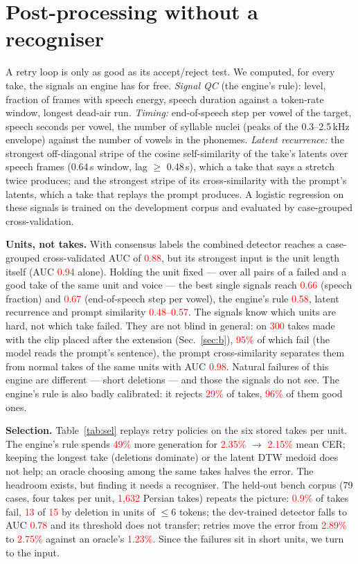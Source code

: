 \documentclass[conference]{IEEEtran}
\newcommand{\RES}[1]{\textcolor{red}{#1}}
\begin{document}
\section{Post-processing without a recogniser}\label{sec:a}
A retry loop is only as good as its accept/reject test. We computed, for every take, the signals an engine
has for free.
\emph{Signal QC} (the engine's rule): level, fraction of frames with speech energy, speech duration against
a token-rate window, longest dead-air run.
\emph{Timing:} end-of-speech step per vowel of the target, speech seconds per vowel, the number of syllable
nuclei (peaks of the 0.3--2.5\,kHz envelope) against the number of vowels in the phonemes.
\emph{Latent recurrence:} the strongest off-diagonal stripe of the cosine self-similarity of the take's
latents over speech frames (0.64\,s window, lag $\ge$ 0.48\,s), which a take that says a stretch twice
produces; and the strongest stripe of its cross-similarity with the prompt's latents, which a take that
replays the prompt produces.
A logistic regression on these signals is trained on the development corpus and evaluated by
case-grouped cross-validation.

\textbf{Units, not takes.} With consensus labels the combined detector reaches a case-grouped
cross-validated AUC of \RES{0.88}, but its strongest input is the unit length itself (AUC \RES{0.94} alone).
Holding the unit fixed --- over all pairs of a failed and a good take of the same unit and voice --- the best
single signals reach \RES{0.66} (speech fraction) and \RES{0.67} (end-of-speech step per vowel), the engine's
rule \RES{0.58}, latent recurrence and prompt similarity \RES{0.48--0.57}. The signals know which units are
hard, not which take failed. They are not blind in general: on \RES{300} takes made with the clip placed
after the extension (Sec.~\ref{sec:b}), \RES{95\%} of which fail (the model reads the prompt's sentence), the prompt cross-similarity
separates them from normal takes of the same units with AUC \RES{0.98}. Natural failures of this engine are
different --- short deletions --- and those the signals do not see. The engine's rule is also badly calibrated: it rejects \RES{29\%} of takes,
\RES{96\%} of them good ones.

\textbf{Selection.} Table~\ref{tab:sel} replays retry policies on the six stored takes per unit. The
engine's rule spends \RES{49\%} more generation for \RES{2.35\%} $\to$ \RES{2.15\%} mean CER; keeping the
longest take (deletions dominate) or the latent DTW medoid does not help; an oracle choosing among the same
takes halves the error. The headroom exists, but finding it needs a recogniser. The held-out bench corpus (79 cases, four
takes per unit, \RES{1{,}632} Persian takes) repeats the picture: \RES{0.9\%} of takes fail, \RES{13} of
\RES{15} by deletion in units of $\le$6 tokens; the dev-trained detector falls to AUC \RES{0.78} and its
threshold does not transfer; retries move the error from \RES{2.89\%} to \RES{2.75\%} against an oracle's
\RES{1.23\%}. Since the failures sit in short units, we turn to the input.
\end{document}
